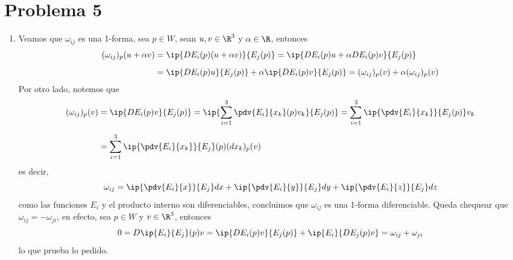 \documentclass{article}
\begin{document}
\section*{Problema 5}
\begin{enumerate}
    \item Veamos que $\omega_{ij}$ es una 1-forma, sea $p\in W$, sean $u,v\in\R^{3}$ y 
    $\alpha\in\R$, entonces
    \begin{align*}
        (\omega_{ij})_{p}(u+\alpha v) &= \ip{DE_{i}(p)(u+\alpha v)}{E_{j}(p)}
        =\ip{DE_{i}(p)u+\alpha DE_{i}(p)v}{E_{j}(p)} \\[2mm]
        &= \ip{DE_{i}(p)u}{E_{j}(p)}+\alpha\ip{DE_{i}(p)v}{E_{j}(p)}
        =(\omega_{ij})_{p}(v)+\alpha(\omega_{ij})_{p}(v)
    \end{align*}
    Por otro lado, notemos que
    \begin{align*}
        (\omega_{ij})_{p}(v) &= \ip{DE_{i}(p)v}{E_{j}(p)}=\ip{\sum_{i=1}^{3}\pdv{E_{i}}
        {x_{k}}(p)v_{k}}{E_{j}(p)}=\sum_{i=1}^{3}\ip{\pdv{E_{i}}{x_{k}}}{E_{j}(p)}v_{k} \\[2mm]
        &= \sum_{i=1}^{3}\ip{\pdv{E_{i}}{x_{k}}}{E_{j}}(p)(dx_{k})_{p}(v)
    \end{align*}
    es decir,
    \begin{equation*}
        \omega_{ij}=\ip{\pdv{E_{i}}{x}}{E_{j}}dx+\ip{\pdv{E_{i}}{y}}{E_{j}}dy
        +\ip{\pdv{E_{i}}{z}}{E_{j}}dz
    \end{equation*}
    como las funciones $E_{i}$ y el producto interno son diferenciables, concluimos que 
    $\omega_{ij}$ es una 1-forma diferenciable. Queda chequear que $\omega_{ij}=-\omega_{ji}$, en
    efecto, sea $p\in W$ y $v\in\R^{3}$, entonces
    \begin{equation*}
        0=D\ip{E_{i}}{E_{j}}(p)v=\ip{DE_{i}(p)v}{E_{j}(p)}+\ip{E_{i}}{DE_{j}(p)v}
        =\omega_{ij}+\omega_{ji}
    \end{equation*}
    lo que prueba lo pedido.
    

\end{enumerate}
\end{document}
